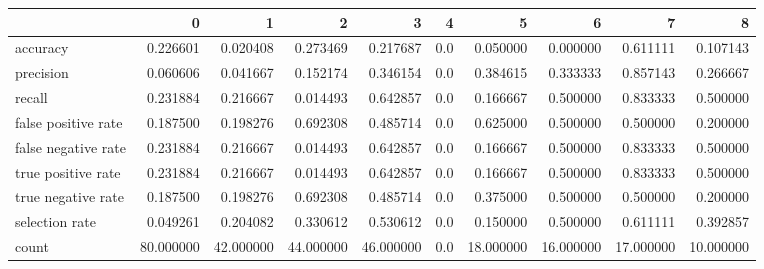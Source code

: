 \begin{tabular}{lrrrrrrrrr}
\toprule
{} &          0 &          1 &          2 &          3 &    4 &          5 &          6 &          7 &          8 \\
\midrule
accuracy            &   0.226601 &   0.020408 &   0.273469 &   0.217687 &  0.0 &   0.050000 &   0.000000 &   0.611111 &   0.107143 \\
precision           &   0.060606 &   0.041667 &   0.152174 &   0.346154 &  0.0 &   0.384615 &   0.333333 &   0.857143 &   0.266667 \\
recall              &   0.231884 &   0.216667 &   0.014493 &   0.642857 &  0.0 &   0.166667 &   0.500000 &   0.833333 &   0.500000 \\
false positive rate &   0.187500 &   0.198276 &   0.692308 &   0.485714 &  0.0 &   0.625000 &   0.500000 &   0.500000 &   0.200000 \\
false negative rate &   0.231884 &   0.216667 &   0.014493 &   0.642857 &  0.0 &   0.166667 &   0.500000 &   0.833333 &   0.500000 \\
true positive rate  &   0.231884 &   0.216667 &   0.014493 &   0.642857 &  0.0 &   0.166667 &   0.500000 &   0.833333 &   0.500000 \\
true negative rate  &   0.187500 &   0.198276 &   0.692308 &   0.485714 &  0.0 &   0.375000 &   0.500000 &   0.500000 &   0.200000 \\
selection rate      &   0.049261 &   0.204082 &   0.330612 &   0.530612 &  0.0 &   0.150000 &   0.500000 &   0.611111 &   0.392857 \\
count               &  80.000000 &  42.000000 &  44.000000 &  46.000000 &  0.0 &  18.000000 &  16.000000 &  17.000000 &  10.000000 \\
\bottomrule
\end{tabular}
